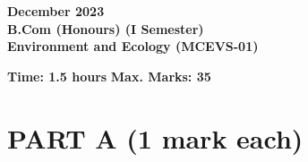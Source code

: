 \documentclass[12pt,a4paper]{article}
\begin{document}
\pagecolor{pagecolor}

\begin{center}
    \textbf{December 2023} \\
    \textbf{B.Com (Honours) (I Semester)} \\
    \textbf{Environment and Ecology (MCEVS-01)}
\end{center}

\vspace{1em}

\noindent \textbf{Time: 1.5 hours} \hfill \textbf{Max. Marks: 35}

\vspace{1em}

\section*{\textbf{PART A (1 mark each)}}
\end{document}
